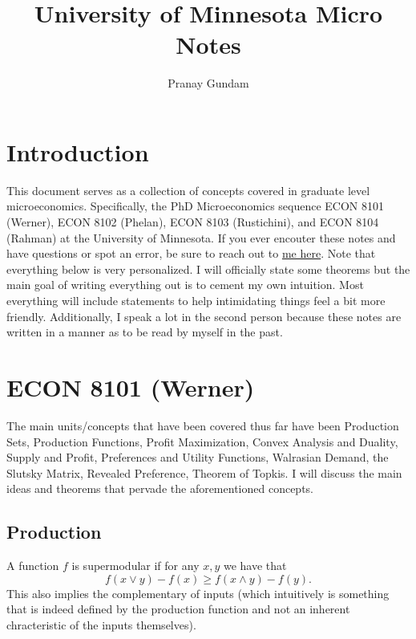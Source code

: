 \documentclass[11pt,english]{article}
\title{\textbf{University of Minnesota Micro Notes}}
\author{Pranay Gundam}
\begin{document}
\maketitle

\tableofcontents

\section{Introduction}


This document serves as a collection of concepts covered in graduate level microeconomics. Specifically, the PhD Microeconomics sequence ECON 8101 (Werner), ECON 8102 (Phelan), ECON 8103 (Rustichini), and ECON 8104 (Rahman) at the University of Minnesota. If you ever encouter these notes and have questions or spot an error, be sure to reach out to \href{mailto:pranaygundam00@gmail.com}{me here}. Note that everything below is very personalized. I will officially state some theorems but the main goal of writing everything out is to cement my own intuition. Most everything will include statements to help intimidating things feel a bit more friendly. Additionally, I speak a lot in the second person because these notes are written in a manner as to be read by myself in the past.

\section{ECON 8101 (Werner)}

The main units/concepts that have been covered thus far have been Production Sets, Production Functions, Profit Maximization, Convex Analysis and Duality, Supply and Profit, Preferences and Utility Functions, Walrasian Demand, the Slutsky Matrix, Revealed Preference, Theorem of Topkis. I will discuss the main ideas and theorems that pervade the aforementioned concepts.

\subsection{Production}

\begin{definition}[Supermodularity]
A function $f$ is supermodular if for any $x,y$ we have that $$f(x\lor y) - f(x) \geq f(x\land y) - f(y).$$ This also implies the complementary of inputs (which intuitively is something that is indeed defined by the production function and not an inherent chracteristic of the inputs themselves).
\end{definition}
\end{document}
